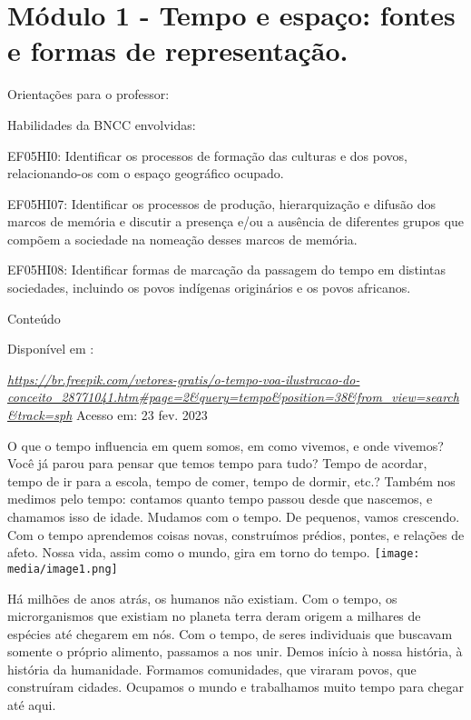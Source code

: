 \section{Módulo 1 - Tempo e espaço: fontes e formas de
representação.}\label{muxf3dulo-1---tempo-e-espauxe7o-fontes-e-formas-de-representauxe7uxe3o.}

Orientações para o professor:

Habilidades da BNCC envolvidas:

EF05HI0: Identificar os processos de formação das culturas e dos povos,
relacionando-os com o espaço geográfico ocupado.

EF05HI07: Identificar os processos de produção, hierarquização e difusão
dos marcos de memória e discutir a presença e/ou a ausência de
diferentes grupos que compõem a sociedade na nomeação desses marcos de
memória.

EF05HI08: Identificar formas de marcação da passagem do tempo em
distintas sociedades, incluindo os povos indígenas originários e os
povos africanos.

Conteúdo

Disponível em :

\href{https://br.freepik.com/vetores-gratis/o-tempo-voa-ilustracao-do-conceito_28771041.htm\#page=2\&query=tempo\&position=38\&from_view=search\&track=sph}{\emph{https://br.freepik.com/vetores-gratis/o-tempo-voa-ilustracao-do-conceito\_28771041.htm\#page=2\&query=tempo\&position=38\&from\_view=search\&track=sph}}
Acesso em: 23 fev. 2023

O que o tempo influencia em quem somos, em como vivemos, e onde vivemos?
Você já parou para pensar que temos tempo para tudo? Tempo de acordar,
tempo de ir para a escola, tempo de comer, tempo de dormir, etc.? Também
nos medimos pelo tempo: contamos quanto tempo passou desde que nascemos,
e chamamos isso de idade. Mudamos com o tempo. De pequenos, vamos
crescendo. Com o tempo aprendemos coisas novas, construímos prédios,
pontes, e relações de afeto. Nossa vida, assim como o mundo, gira em
torno do tempo.
\texttt{[image: media/image1.png]}

Há milhões de anos atrás, os humanos não existiam. Com o tempo, os
microrganismos que existiam no planeta terra deram origem a milhares de
espécies até chegarem em nós. Com o tempo, de seres individuais que
buscavam somente o próprio alimento, passamos a nos unir. Demos início à
nossa história, à história da humanidade. Formamos comunidades, que
viraram povos, que construíram cidades. Ocupamos o mundo e trabalhamos
muito tempo para chegar até aqui.

